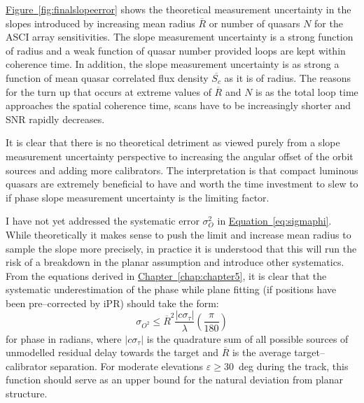 		\hyperref[fig:finalslopeerror]{Figure~\ref*{fig:finalslopeerror}} shows the theoretical measurement uncertainty in the slopes introduced by increasing mean radius $\overline{R}$ or number of quasars $N$ for the ASCI array sensitivities. The slope measurement uncertainty is a strong function of radius and a weak function of quasar number provided loops are kept within coherence time. In addition, the slope measurement uncertainty is as strong a function of mean quasar correlated flux density $\overline{S_c}$ as it is of radius. The reasons for the turn up that occurs at extreme values of $\overline{R}$ and $N$ is as the total loop time approaches the spatial coherence time, scans have to be increasingly shorter and SNR rapidly decreases.
		
		It is clear that there is no theoretical detriment as viewed purely from a slope measurement uncertainty perspective to increasing the angular offset of the orbit sources and adding more calibrators. The interpretation is that compact luminous quasars are extremely beneficial to have and worth the time investment to slew to if phase slope measurement uncertainty is the limiting factor.
		
		I have not yet addressed the systematic error $\sigma_O^2$ in \hyperref[eq:sigmaphi]{Equation~\ref*{eq:sigmaphi}}. While theoretically it makes sense to push the limit and increase mean radius to sample the slope more precisely, in practice it is understood that this will run the risk of a breakdown in the planar assumption and introduce other systematics. From the equations derived in \hyperref[chap:chapter5]{Chapter~\ref*{chap:chapter5}}, it is clear that the systematic underestimation of the phase while plane fitting (if positions have been pre--corrected by iPR) should take the form:
		\begin{equation*}
			\sigma_{O^2} \le \overline{R}^2 \frac{|c\sigma_\tau|}{\lambda}\left(\frac{\pi}{180}\right)
		\end{equation*} for phase in radians, where $|c\sigma_\tau|$ is the quadrature sum of all possible sources of unmodelled residual delay towards the target and $\overline{R}$ is the average target--calibrator separation. For moderate elevations $\varepsilon\ge30$~deg during the track, this function should serve as an upper bound for the natural deviation from planar structure.
	
